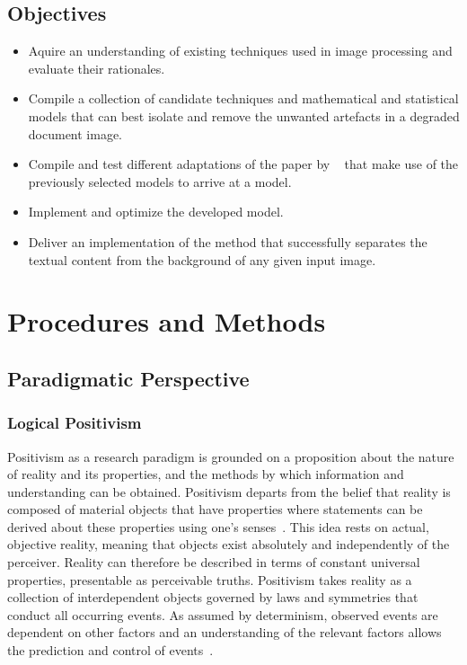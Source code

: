 \documentclass[a4paper, 12pt]{report}
\begin{document}
\subsection{Objectives}
\begin{itemize}
    \item Aquire an understanding of existing techniques used in image processing and evaluate their rationales.
    \item Compile a collection of candidate techniques and mathematical and statistical models that can best isolate and remove the unwanted artefacts in a degraded document image.
    \item Compile and test different adaptations of the paper by ~\cite{su2012robust} that make use of the previously selected models to arrive at a model.
    \item Implement and optimize the developed model.
    \item Deliver an implementation of the method that successfully separates the textual content from the background of any given input image.
\end{itemize}

\newpage

\section{Procedures and Methods}
\subsection{Paradigmatic Perspective}
\subsubsection{Logical Positivism}
Positivism as a research paradigm is grounded on a proposition about the nature of reality and its properties, and the methods by which information and understanding can be obtained. Positivism departs from the belief that reality is composed of material objects that have properties where statements can be derived about these properties using one’s senses~\cite{putnam2012philosophy}. This idea rests on actual, objective reality, meaning that objects exist absolutely and independently of the perceiver. Reality can therefore be described in terms of constant universal properties, presentable as perceivable truths. Positivism takes reality as a collection of interdependent objects governed by laws and symmetries that conduct all occurring events. As assumed by determinism, observed events are dependent on other factors and an understanding of the relevant factors allows the prediction and control of events~\cite{kivunja2017understanding}.\par
\end{document}
